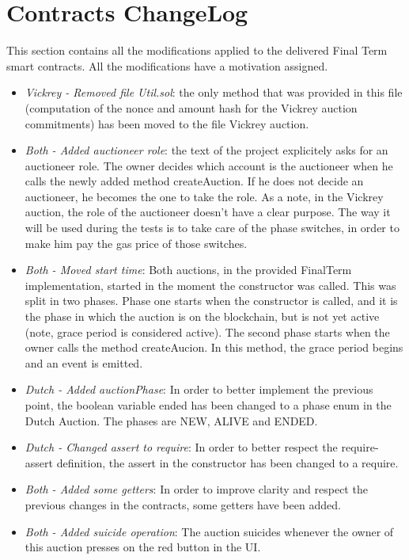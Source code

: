 \documentclass[11pt, a4paper]{report}
\begin{document}
\section*{Contracts ChangeLog}
This section contains all the modifications applied to the delivered Final Term smart contracts. All the modifications have a motivation assigned.
\begin{itemize}
	\item \emph{Vickrey - Removed file Util.sol}: the only method that was provided in this file (computation of the nonce and amount hash for the Vickrey auction commitments) has been moved to the file Vickrey auction. 
	\item \emph{Both - Added auctioneer role}: the text of the project explicitely asks for an auctioneer role. The owner decides which account is the auctioneer when he calls the newly added method createAuction. If he does not decide an auctioneer, he becomes the one to take the role. As a note, in the Vickrey auction, the role of the auctioneer doesn't have a clear purpose. The way it will be used during the tests is to take care of the phase switches, in order to make him pay the gas price of those switches.
	\item \emph{Both - Moved start time}: Both auctions, in the provided FinalTerm implementation, started in the moment the constructor was called. This was split in two phases. Phase one starts when the constructor is called, and it is the phase in which the auction is on the blockchain, but is not yet active (note, grace period is considered active). The second phase starts when the owner calls the method createAucion. In this method, the grace period begins and an event is emitted.
	\item \emph{Dutch - Added auctionPhase}: In order to better implement the previous point, the boolean variable ended has been changed to a phase enum in the Dutch Auction. The phases are NEW, ALIVE and ENDED.
	\item \emph{Dutch - Changed assert to require}: In order to better respect the require-assert definition, the assert in the constructor has been changed to a require.
	\item \emph{Both - Added some getters}: In order to improve clarity and respect the previous changes in the contracts, some getters have been added.
	\item \emph{Both - Added suicide operation}: The auction suicides whenever the owner of this auction presses on the red button in the UI.
\end{itemize}
\end{document}
